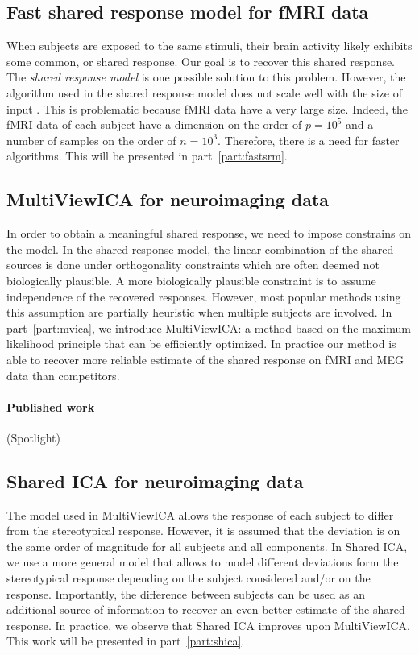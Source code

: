 \documentclass[ twoside,openright,titlepage,numbers=noenddot,%
                headinclude,footinclude,cleardoublepage=empty,abstract=on,
                BCOR=5mm,paper=a4,fontsize=11pt, 
                ]{scrreprt}
\begin{document}
\subsection{Fast shared response model for fMRI data}
When subjects are exposed to the same stimuli, their brain activity likely exhibits
some common, or shared response. Our goal is to recover this shared response. The \emph{shared
response model} is one possible solution to this problem.
However, the algorithm used in the shared response model does not scale well
with the size of input . This is problematic because fMRI data have a very large
size. Indeed, the fMRI data of each subject have a dimension on the order of
$p=10^5$ and a number of samples on the order of $n=10^3$. Therefore, there is a
need for faster algorithms. This will be presented in part~\ref{part:fastsrm}.

\subsection{MultiViewICA for neuroimaging data}
In order to obtain a meaningful shared response, we need to impose constrains on
the model. In the shared response model, the linear combination of the shared
sources is done under orthogonality constraints which are often deemed not
biologically plausible. A more biologically plausible constraint is
to assume independence of the recovered responses.
However, most popular methods using this assumption are partially heuristic when
multiple subjects are involved.
In part~\ref{part:mvica}, we introduce MultiViewICA: a method based on the
maximum likelihood principle that can be efficiently optimized.
In practice our method is able to recover more reliable estimate of
the shared response on fMRI and MEG data than competitors.

\paragraph{Published work} (Spotlight)

\subsection{Shared ICA for neuroimaging data}
The model used in MultiViewICA allows the response of each subject to differ
from the stereotypical response. However, it is assumed that the deviation is on
the same order of magnitude for all subjects and all components.
In Shared ICA, we use a more general model that allows to model different
deviations form the stereotypical response depending on the subject considered
and/or on the response. Importantly, the difference between subjects can be used
as an additional source of information to recover an even better estimate of the
shared response. In practice, we observe that Shared ICA improves upon
MultiViewICA. This work will be presented in part~\ref{part:shica}.
\end{document}
